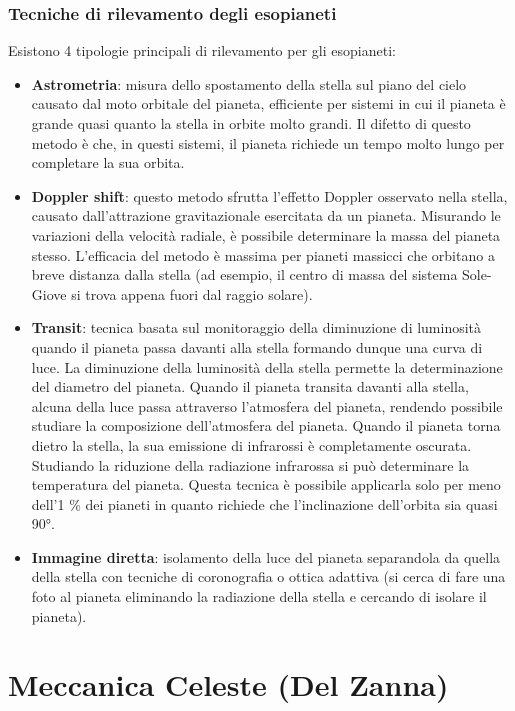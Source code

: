 \documentclass[a4paper, oneside]{book}
\begin{document}
\section{Tecniche di rilevamento degli esopianeti}
Esistono 4 tipologie principali di rilevamento per gli esopianeti:
\begin{itemize}
    \item \textbf{Astrometria}: misura dello spostamento della stella sul piano del cielo causato dal moto orbitale del pianeta, efficiente per sistemi in cui il pianeta è grande quasi quanto la stella in orbite 
    molto grandi. Il difetto di questo metodo è che, in questi sistemi, il pianeta richiede un tempo molto lungo per completare la sua orbita.
    \item \textbf{Doppler shift}: questo metodo sfrutta l'effetto Doppler osservato nella stella, causato dall'attrazione gravitazionale esercitata da un pianeta.
    Misurando le variazioni della velocità radiale, è possibile determinare la massa del pianeta stesso. L'efficacia del metodo è massima per pianeti massicci che
    orbitano a breve distanza dalla stella (ad esempio, il centro di massa del sistema Sole-Giove si trova appena fuori dal raggio solare).
    \item \textbf{Transit}: tecnica basata sul monitoraggio della diminuzione di luminosità quando 
    il pianeta passa davanti alla stella formando dunque una curva di luce. La diminuzione della luminosità della stella
    permette la determinazione del diametro del pianeta.  Quando il pianeta transita davanti alla stella,
    alcuna della luce passa attraverso l'atmosfera del pianeta, rendendo possibile
    studiare la composizione dell'atmosfera del pianeta. Quando il pianeta
    torna dietro la stella, la sua emissione di infrarossi è completamente oscurata. Studiando 
    la riduzione della radiazione infrarossa si può determinare la temperatura del pianeta.  Questa tecnica
    è possibile applicarla solo per meno dell'1 \% dei pianeti in quanto richiede che 
    l'inclinazione dell'orbita sia quasi 90°. 
    \item \textbf{Immagine diretta}:  isolamento della luce del pianeta separandola da quella della stella 
    con tecniche di coronografia o ottica adattiva (si cerca di fare una foto al pianeta eliminando la radiazione
    della stella e cercando di isolare il pianeta).
\end{itemize}

\part{Meccanica Celeste (Del Zanna)}
\end{document}
